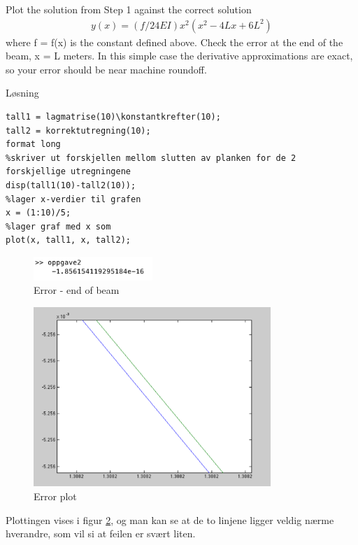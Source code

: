% 

Plot the solution from Step 1 against the correct solution
\begin{align}
	y(x) = (f/24EI)x^2(x^2 − 4Lx + 6L^2)
\end{align}
where f = f(x) is the constant defined above.
\newline
\newline
Check the error at the end of the beam, x = L meters. In this simple case the derivative approximations are exact, so your error should be near machine roundoff.

\vspace{5mm}
Løsning

\begin{lstlisting}[caption={oppgave2.m}]
tall1 = lagmatrise(10)\konstantkrefter(10);
tall2 = korrektutregning(10);
format long
%skriver ut forskjellen mellom slutten av planken for de 2 forskjellige utregningene
disp(tall1(10)-tall2(10));
%lager x-verdier til grafen
x = (1:10)/5;
%lager graf med x som
plot(x, tall1, x, tall2); 
\end{lstlisting}

\vspace{3mm}

\begin{figure}[h]
    \centering
    \includegraphics[width=0.4\textwidth]{sections/Exercise2/disp2}
    \caption{Error - end of beam}
    \label{fig:disp2}
\end{figure}

\begin{figure}[h]
    \centering
    \includegraphics[width=0.8\textwidth]{sections/Exercise2/errorplot2}
    \caption{Error plot}
    \label{fig:errorplot2}
\end{figure}
 
Plottingen vises i figur \ref{fig:errorplot2}, og man kan se at de to linjene ligger veldig nærme hverandre, som vil si at feilen er svært liten.


% 